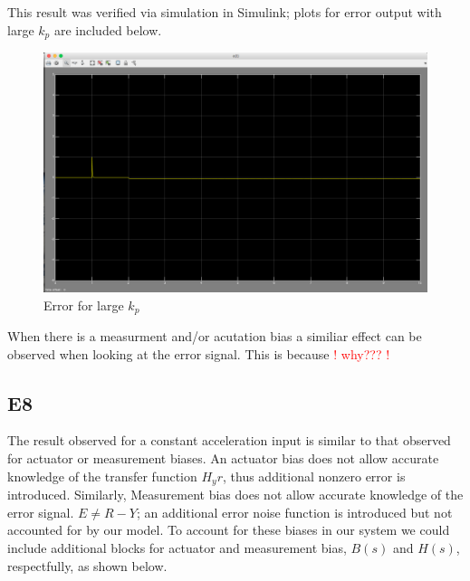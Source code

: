 \documentclass[10pt,titlepage]{article}
\begin{document}
		This result was verified via simulation in Simulink; plots for error output with large $k_p$ are included below. \\
		\begin{figure}[H]
			\centering
			\includegraphics[scale=0.3]{e7}
			\caption{Error for large $k_p$}
		\end{figure}
		When there is a measurment and/or acutation bias a similiar effect can be observed when looking at the error signal. This is because \textcolor{red}{! why??? !}
		
	\subsection*{E8}
		The result observed for a constant acceleration input is similar to that observed for actuator or measurement biases. An actuator bias does not allow accurate knowledge of the transfer function $H_yr$, thus additional nonzero error is introduced. Similarly, Measurement bias does not allow accurate knowledge of the error signal. $E\neq R-Y$; an additional error noise function is introduced but not accounted for by our model. To account for these biases in our system we could include additional blocks for actuator and measurement bias, $B(s)$ and $H(s)$, respectfully, as shown below.
	
\end{document}
